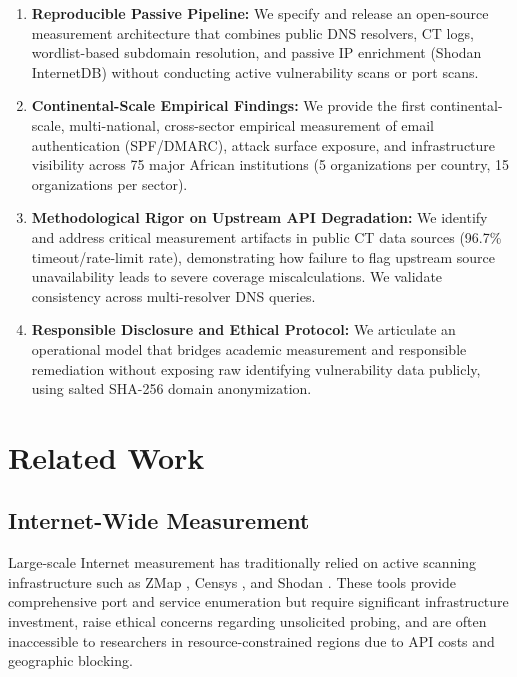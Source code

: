 \documentclass[conference]{IEEEtran}
\begin{document}
\begin{enumerate}
    \item \textbf{Reproducible Passive Pipeline:} We specify and release an open-source measurement architecture that combines public DNS resolvers, CT logs, wordlist-based subdomain resolution, and passive IP enrichment (Shodan InternetDB) without conducting active vulnerability scans or port scans.
    
    \item \textbf{Continental-Scale Empirical Findings:} We provide the first continental-scale, multi-national, cross-sector empirical measurement of email authentication (SPF/DMARC), attack surface exposure, and infrastructure visibility across 75 major African institutions (5 organizations per country, 15 organizations per sector).
    
    \item \textbf{Methodological Rigor on Upstream API Degradation:} We identify and address critical measurement artifacts in public CT data sources (96.7\% timeout/rate-limit rate), demonstrating how failure to flag upstream source unavailability leads to severe coverage miscalculations. We validate consistency across multi-resolver DNS queries.
    
    \item \textbf{Responsible Disclosure and Ethical Protocol:} We articulate an operational model that bridges academic measurement and responsible remediation without exposing raw identifying vulnerability data publicly, using salted SHA-256 domain anonymization.
\end{enumerate}

\section{Related Work}

\subsection{Internet-Wide Measurement}
Large-scale Internet measurement has traditionally relied on active scanning infrastructure such as ZMap \cite{durumeric2013zmap}, Censys \cite{durumeric2015search}, and Shodan \cite{matherly2015shodan}. These tools provide comprehensive port and service enumeration but require significant infrastructure investment, raise ethical concerns regarding unsolicited probing, and are often inaccessible to researchers in resource-constrained regions due to API costs and geographic blocking.
\end{document}
